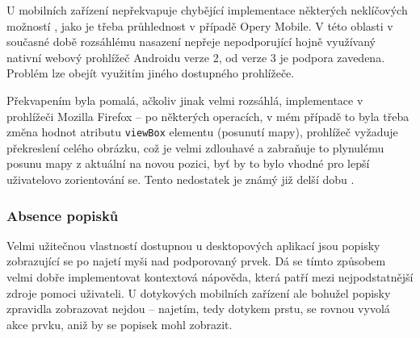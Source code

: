 U mobilních zařízení nepřekvapuje chybějící implementace některých neklíčových možností , jako je třeba průhlednost v případě Opery Mobile. V této oblasti v současné době rozsáhlému nasazení nepřeje  nepodporující hojně využívaný nativní webový prohlížeč Androidu verze 2, od verze 3 je podpora zavedena. Problém lze obejít využitím jiného dostupného prohlížeče.

Překvapením byla pomalá, ačkoliv jinak velmi rozsáhlá, implementace  v prohlížeči Mozilla Firefox -- po některých operacích, v mém případě to byla třeba změna hodnot atributu \texttt{viewBox}  elementu (posunutí mapy), prohlížeč vyžaduje překreslení celého obrázku, což je velmi zdlouhavé a zabraňuje to plynulému posunu mapy z aktuální na novou pozici, byť by to bylo vhodné pro lepší uživatelovo zorientování se. Tento nedostatek je známý již delší dobu \cite{Bugzilla}.

\subsubsection{Absence popisků}
Velmi užitečnou vlastností dostupnou u desktopových aplikací jsou popisky zobrazující se po najetí myši nad podporovaný prvek. Dá se tímto způsobem velmi dobře implementovat kontextová nápověda, která patří mezi nejpodstatnější zdroje pomoci uživateli. U dotykových mobilních zařízení ale bohužel popisky zpravidla zobrazovat nejdou -- najetím, tedy dotykem prstu, se rovnou vyvolá akce prvku, aniž by se popisek mohl zobrazit.

